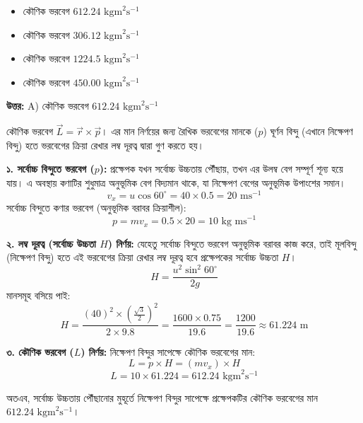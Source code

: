 \documentclass[12pt, a4paper]{article}
\begin{document}
\begin{itemize}[label={}, leftmargin=1cm, itemsep=0.5em]
\item[\textbf{A)}] কৌণিক ভরবেগ $612.24\text{ kgm}^2\text{s}^{-1}$
\item[\textbf{B)}] কৌণিক ভরবেগ $306.12\text{ kgm}^2\text{s}^{-1}$
\item[\textbf{C)}] কৌণিক ভরবেগ $1224.5\text{ kgm}^2\text{s}^{-1}$
\item[\textbf{D)}] কৌণিক ভরবেগ $450.00\text{ kgm}^2\text{s}^{-1}$
\end{itemize}

\vspace{0.5em}
\begin{tcolorbox}[answerbox]
\textbf{\color{success} উত্তর:} A) কৌণিক ভরবেগ $612.24\text{ kgm}^2\text{s}^{-1}$
\end{tcolorbox}
\vspace{1em}

\begin{tcolorbox}[solutionbox={সমাধান (Solution)}]
\noindent
কৌণিক ভরবেগ $\vec{L} = \vec{r} \times \vec{p}$। এর মান নির্ণয়ের জন্য রৈখিক ভরবেগের মানকে ($p$) ঘূর্ণন বিন্দু (এখানে নিক্ষেপণ বিন্দু) হতে ভরবেগের ক্রিয়া রেখার লম্ব দূরত্ব দ্বারা গুণ করতে হয়।

\vspace{0.5em}
\textbf{১. সর্বোচ্চ বিন্দুতে ভরবেগ ($p$):}
প্রক্ষেপক যখন সর্বোচ্চ উচ্চতায় পৌঁছায়, তখন এর উলম্ব বেগ সম্পূর্ণ শূন্য হয়ে যায়। এ অবস্থায় কণাটির শুধুমাত্র অনুভূমিক বেগ বিদ্যমান থাকে, যা নিক্ষেপণ বেগের অনুভূমিক উপাংশের সমান।
$$v_x = u \cos 60^\circ = 40 \times 0.5 = 20\text{ ms}^{-1}$$
সর্বোচ্চ বিন্দুতে কণার ভরবেগ (অনুভূমিক বরাবর ক্রিয়াশীল):
$$p = m v_x = 0.5 \times 20 = 10\text{ kg ms}^{-1}$$

\vspace{0.5em}
\textbf{২. লম্ব দূরত্ব (সর্বোচ্চ উচ্চতা $H$) নির্ণয়:}
যেহেতু সর্বোচ্চ বিন্দুতে ভরবেগ অনুভূমিক বরাবর কাজ করে, তাই মূলবিন্দু (নিক্ষেপণ বিন্দু) হতে এই ভরবেগের ক্রিয়া রেখার লম্ব দূরত্ব হবে প্রক্ষেপকের সর্বোচ্চ উচ্চতা $H$।
$$H = \frac{u^2 \sin^2 60^\circ}{2g}$$
মানসমূহ বসিয়ে পাই:
$$H = \frac{(40)^2 \times \left(\frac{\sqrt{3}}{2}\right)^2}{2 \times 9.8} = \frac{1600 \times 0.75}{19.6} = \frac{1200}{19.6} \approx 61.224\text{ m}$$

\vspace{0.5em}
\textbf{৩. কৌণিক ভরবেগ ($L$) নির্ণয়:}
নিক্ষেপণ বিন্দুর সাপেক্ষে কৌণিক ভরবেগের মান:
$$L = p \times H = (m v_x) \times H$$
$$L = 10 \times 61.224 = 612.24\text{ kgm}^2\text{s}^{-1}$$

অতএব, সর্বোচ্চ উচ্চতায় পৌঁছানোর মুহূর্তে নিক্ষেপণ বিন্দুর সাপেক্ষে প্রক্ষেপকটির কৌণিক ভরবেগের মান $612.24\text{ kgm}^2\text{s}^{-1}$।
\end{tcolorbox}
\vspace{1em}
\end{document}
